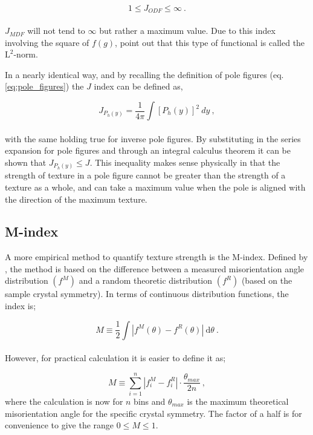 \documentclass[a4paper,12pt]{report}
\numberwithin{equation}{chapter}
\begin{document}
\begin{equation}
1 \leq J_{ODF} \leq \infty\ .
\end{equation}
\\
$J_{MDF}$ will not tend to $\infty$ but rather a maximum value. Due to this index involving the square of $f(g)$, \cite{Mainprice} point out that this type of functional is called the $\mathrm{L^2}$-norm. 

In a nearly identical way, and by recalling the definition of pole figures (eq. \ref{eq:pole_figures}) the $J$ index can be defined as,
 
\begin{equation}
J_{P_h(y)} = \frac{1}{4\pi} \int [ P_{h}(y) ]^2\ dy\ ,
\end{equation}
\\
with the same holding true for inverse pole figures. By substituting in the series expansion for pole figures and through an integral calculus theorem \citep[p.90]{bunge1982texture} it can be shown that $J_{P_h(y)} \leq J$. This inequality makes sense physically in that the strength of texture in a pole figure cannot be greater than the strength of a texture as a whole, and can take a maximum value when the pole is aligned with the direction of the maximum texture. 


\subsection{M-index} \label{subsec:Mindex}
A more empirical method to quantify texture strength is the M-index. Defined by \cite{Skemer}, the method is based on the difference between a measured misorientation angle distribution $(f^M)$ and a random theoretic distribution $(f^R)$ (based on the sample crystal symmetry). In terms of continuous distribution functions, the index is;

\begin{equation} \label{eq:Mindex_cont}
M \equiv \frac{1}{2} \int | f^M(\theta) - f^R(\theta) |\ \mathrm{d}\theta \ .
\end{equation}  
\\   
However, for practical calculation it is easier to define it as;

\begin{equation} \label{eq:Mindex_disc}
M \equiv \sum_{i=1}^n | f_i^M - f_i^R | \cdot \frac{\theta_{max}}{2n}\ ,
\end{equation} 
where the calculation is now for $n$ bins and $\theta_{max}$ is the maximum theoretical misorientation angle for the specific crystal symmetry. The factor of a half is for convenience to give the range $0 \leq M \leq 1$. 
\end{document}
